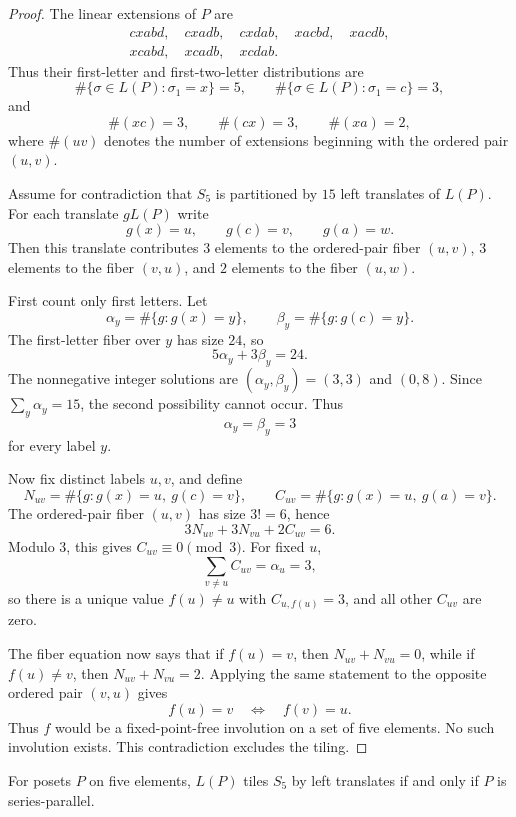 \begin{proof}
The linear extensions of $P$ are
\[
\begin{gathered}
cxabd,\quad cxadb,\quad cxdab,\quad xacbd,\quad xacdb,\\
xcabd,\quad xcadb,\quad xcdab.
\end{gathered}
\]
Thus their first-letter and first-two-letter distributions are
\[
\#\{\sigma\in L(P):\sigma_1=x\}=5,\qquad
\#\{\sigma\in L(P):\sigma_1=c\}=3,
\]
and
\[
\#(xc)=3,\qquad \#(cx)=3,\qquad \#(xa)=2,
\]
where $\#(uv)$ denotes the number of extensions beginning with the ordered
pair $(u,v)$.

Assume for contradiction that $S_5$ is partitioned by $15$ left
translates of $L(P)$.  For each translate $gL(P)$ write
\[
        g(x)=u,\qquad g(c)=v,\qquad g(a)=w.
\]
Then this translate contributes $3$ elements to the ordered-pair fiber
$(u,v)$, $3$ elements to the fiber $(v,u)$, and $2$ elements to the fiber
$(u,w)$.

First count only first letters.  Let
\[
\alpha_y=\#\{g:g(x)=y\},\qquad
\beta_y=\#\{g:g(c)=y\}.
\]
The first-letter fiber over $y$ has size $24$, so
\[
        5\alpha_y+3\beta_y=24.
\]
The nonnegative integer solutions are $(\alpha_y,\beta_y)=(3,3)$ and
$(0,8)$.  Since $\sum_y\alpha_y=15$, the second possibility cannot occur.
Thus
\[
        \alpha_y=\beta_y=3
\]
for every label $y$.

Now fix distinct labels $u,v$, and define
\[
N_{uv}=\#\{g:g(x)=u,\ g(c)=v\},\qquad
C_{uv}=\#\{g:g(x)=u,\ g(a)=v\}.
\]
The ordered-pair fiber $(u,v)$ has size $3!=6$, hence
\[
        3N_{uv}+3N_{vu}+2C_{uv}=6.
\]
Modulo $3$, this gives $C_{uv}\equiv 0\pmod 3$.  For fixed $u$,
\[
        \sum_{v\ne u} C_{uv}=\alpha_u=3,
\]
so there is a unique value $f(u)\ne u$ with $C_{u,f(u)}=3$, and all other
$C_{uv}$ are zero.

The fiber equation now says that if $f(u)=v$, then
$N_{uv}+N_{vu}=0$, while if $f(u)\ne v$, then $N_{uv}+N_{vu}=2$.  Applying
the same statement to the opposite ordered pair $(v,u)$ gives
\[
        f(u)=v \quad\Longleftrightarrow\quad f(v)=u.
\]
Thus $f$ would be a fixed-point-free involution on a set of five
elements.  No such involution exists.  This contradiction excludes the
tiling.
\end{proof}

\begin{theorem}[$S_5$ classification]
\label{thm:s5-classification}
For posets $P$ on five elements, $L(P)$ tiles $S_5$ by left translates if
and only if $P$ is series-parallel.
\end{theorem}

